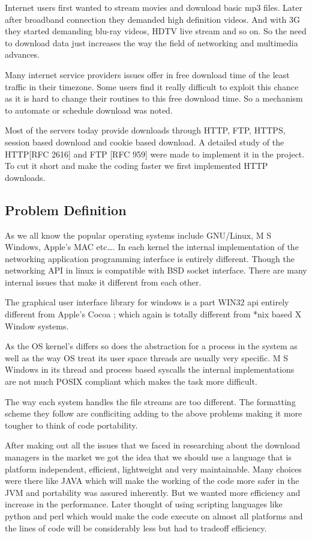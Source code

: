 \documentclass[pdftex,12pt,a4paper,pdfencoding=unicode]{article}
\begin{document}
\begin{onehalfspace}
      Internet users first wanted to stream movies and download basic mp3 files. Later after broadband connection they demanded high
      definition videos. And with 3G they started demanding blu-ray videos, HDTV live stream and so on. So the need to download data
      just increases the way the field of networking and multimedia advances.

      Many internet service providers issues offer in free download time of the least traffic in their timezone. Some users find it really
      difficult to exploit this chance as it is hard to change their routines to this free download time. So a mechanism to automate or
      schedule download was noted.

      Most of the servers today provide downloads through HTTP, FTP, HTTPS, session based download and cookie based download. A detailed
      study of the HTTP[RFC 2616] and FTP [RFC 959] were made to implement it in the project. To cut it short and make the coding faster
      we first implemented  HTTP downloads.

      \subsection{Problem Definition}
      As we all know the popular operating systems include GNU/Linux, M S Windows, Apple's MAC etc\ldots. In each kernel the internal
      implementation of the networking application programming interface is entirely different. Though the networking API in linux is
      compatible with BSD socket interface. There are many internal issues that make it different from each other.

      The graphical user interface library for windows is a part  WIN32 api entirely different from Apple's Cocoa ; which again is totally
      different from *nix based X Window systems.

      As the OS kernel's differs so does the abstraction for a process in the system as well as the way OS treat its user space threads are
      usually very specific. M S Windows in its thread and process based syscalls the internal implementations are not much POSIX compliant
      which makes the task more difficult.

      The way each system handles the file streams are too different. The formatting scheme they follow are confliciting adding to the above
      problems making it more tougher to think of code portability.

      After making out all the issues that we faced in researching about the download managers in the market we got the idea that we should
      use a language that is platform independent, efficient, lightweight and very maintainable. Many choices were there like JAVA which
      will make the working of the code more safer in the JVM and portability was assured inherently. But we wanted more efficiency and
      increase in the performance. Later thought of using scripting languages like python and perl which would make the code execute on
      almost all platforms and the lines of code will be considerably less but had to tradeoff efficiency.


\end{onehalfspace}
\end{document}
